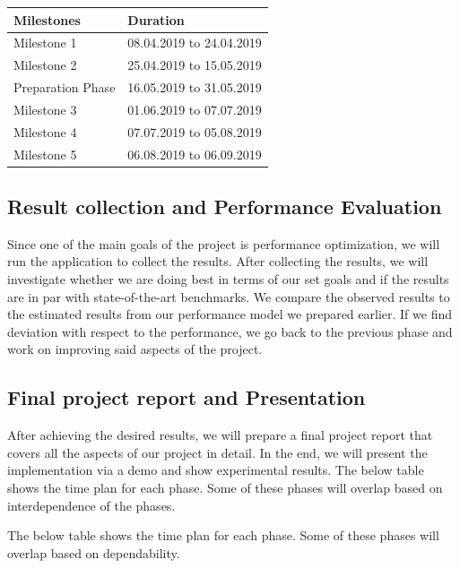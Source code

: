 \documentclass[titlepage]{report}
\begin{document}
\begin{table}[]
\begin{tabular}{|l|l|}
\hline
\textbf{Milestones}                   & \textbf{Duration}                  \\ \hline
Milestone 1                 & 08.04.2019 to 24.04.2019 \\ \hline
Milestone 2                 & 25.04.2019 to 15.05.2019 \\ \hline
Preparation Phase & 16.05.2019 to 31.05.2019 \\ \hline
Milestone 3                 & 01.06.2019 to 07.07.2019 \\ \hline
Milestone 4                 & 07.07.2019 to 05.08.2019 \\ \hline
Milestone 5                 & 06.08.2019 to 06.09.2019 \\ \hline
\end{tabular}
\end{table}

\subsection{Result collection and Performance Evaluation}
Since one of the main goals of the project is performance optimization, we will run the application to collect the results. After collecting the results, we will investigate whether we are doing best in terms of our set goals and if the results are in par with state-of-the-art benchmarks. We compare the observed results to the estimated results from our performance model we prepared earlier. If we find deviation with respect to the performance, we go back to the previous phase and work on improving said aspects of the project.

\subsection{Final project report and Presentation}
After achieving the desired results, we will prepare a final project report that covers all the aspects of our project in detail. In the end, we will present the implementation via a demo and show experimental results. The below table shows the time plan for each phase. Some of these phases will overlap based on interdependence of the phases. 

The below table shows the time plan for each phase. Some of these phases will overlap based on dependability.
\end{document}
